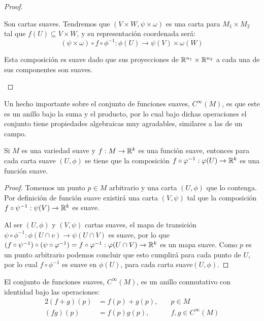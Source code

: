 \begin{proof}
\begin{itemize}
		      Son cartas suaves. Tendremos que $(V \times W, \psi \times \omega)$ es una carta para $M_1 \times M_2$ tal que $f(U) \subseteq V \times W$, y su representación coordenada será:
		      \[
			      (\psi \times \omega) \circ f \circ \phi^{-1}: \phi(U) \to \psi(V) \times \omega(W)
		      \]

		      Esta composición es suave dado que sus proyecciones de $\mathbb{R}^{n_1} \times \mathbb{R}^{n_2}$ a cada una de sus componentes son suaves.
	\end{itemize}
\end{proof}

Un hecho importante sobre el conjunto de funciones suaves, $C^{\infty}(M)$, es que este es un anillo bajo la suma y el producto, por lo cual bajo dichas operaciones el conjunto tiene propiedades algebraicas muy agradables, similares a las de un campo.

\begin{lemma}
	Si $M$ es una variedad suave y $f: M \to \mathbb{R}^{k}$ es una función suave, entonces para cada carta suave $(U,\phi)$ se tiene que la composición $f \circ \varphi^{-1}: \varphi(U) \to \mathbb{R}^{k}$ es una función suave.
\end{lemma}

\begin{proof}
  Tomemos un punto $p \in M$ arbitrario y una carta $(U, \phi)$ que lo contenga. Por definición de función suave existirá una carta $(V,\psi)$ tal que la composición $f \circ \psi^{-1}: \psi(V) \to \mathbb{R}^{k}$ es suave.

  Al ser $(U,\phi)$ y $(V,\psi)$ cartas suaves, el mapa de transición $\psi \circ \phi^{-1}: \phi(U \cap v) \to \psi(U \cap V)$ es suave, por lo que $(f \circ \psi^{-1}) \circ (\psi \circ \varphi^{-1}) = f \circ \varphi^{-1}: \varphi(U \cap V) \to \mathbb{R}^{k}$ es un mapa suave. Como $p$ es un punto arbitrario podemos concluir que esto cumplirá para cada punto de $U$, por lo cual $f \circ \phi^{-1}$ es suave en $\phi(U)$, para cada carta suave$(U,\phi)$.
\end{proof}

\begin{theorem}
	El conjunto de funciones suaves, $C^{\infty}(M)$, es un anillo conmutativo con identidad bajo las operaciones:
	\begin{alignat*}{2}
		(f+g)(p) & = f(p) + g(p), \quad & p \in M               \\
		(fg)(p)  & = f(p)g(p),          & f,g \in C^{\infty}(M)
	\end{alignat*}
\end{theorem}

